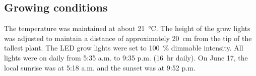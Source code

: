 \subsection{Growing conditions}

The temperature was maintained at about \qty[mode=text]{21}{\degreeCelsius}. The height of the grow lights was adjusted to maintain a distance of approximately \qty[mode=text]{20}{\cm} from the tip of the tallest plant. The LED grow lights were set to \qty[mode=text]{100}{\percent} dimmable intensity. All lights were on daily from 5:35 a.m. to 9:35 p.m. (\qty[mode=text]{16}{hr} daily). On June 17, the local sunrise was at 5:18 a.m. and the sunset was at 9:52 p.m.